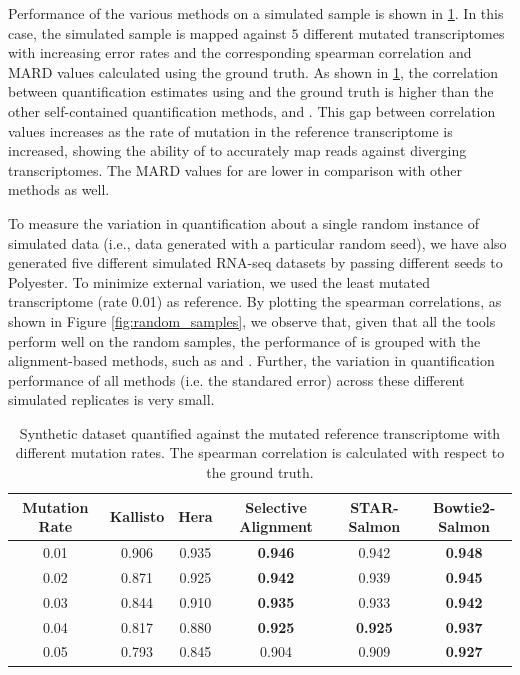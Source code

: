 Performance of the various methods on a simulated sample is shown in \cref{tab:diff_mutation}. In this case, 
the simulated sample is mapped against $5$ different mutated transcriptomes with increasing error rates and the 
corresponding spearman correlation and MARD values calculated using the ground truth. As shown in 
\cref{tab:diff_mutation}, the correlation between quantification estimates using \sla and the ground truth is 
higher than the other self-contained quantification methods, \kallisto and \hera. This gap between correlation 
values increases as the rate of mutation in the reference transcriptome is increased, showing the ability of 
\sla to accurately map reads against diverging transcriptomes. The MARD values for \sla are lower in comparison 
with other \nab methods as well.

To measure the variation in quantification about a single random instance of simulated data (i.e., data generated 
with a particular random seed), we have also generated five different simulated RNA-seq datasets by passing 
different seeds to Polyester. To minimize external variation, we used the least mutated transcriptome 
(rate 0.01) as reference. By plotting the spearman correlations, as shown in Figure \ref{fig:random_samples}, 
we observe that, given that all the tools perform well on the random samples, the performance of \sla is grouped 
with the alignment-based methods, such as \bt and \STAR.  Further, the variation in quantification performance of 
all methods (i.e. the standared error) across these different simulated replicates is very small.

\begin{table}
\begin{center}
\begin{tabular} {c|c c c c c}
\toprule
  Mutation Rate & Kallisto & Hera & Selective Alignment & STAR-Salmon &Bowtie2-Salmon \\
\midrule
  0.01 & 0.906 & 0.935 & \textbf{0.946} & 0.942 & \textbf{0.948} \\
  0.02 & 0.871 & 0.925 & \textbf{0.942} & 0.939 & \textbf{0.945} \\
  0.03 & 0.844 & 0.910 & \textbf{0.935} & 0.933 & \textbf{0.942} \\
  0.04 & 0.817 & 0.880 & \textbf{0.925} & \textbf{0.925} & \textbf{0.937} \\
  0.05 & 0.793 & 0.845 & 0.904 & 0.909 & \textbf{0.927} \\
\bottomrule
\end{tabular}
\caption[Acuracy of qunatification of synthetic dataset against the mutated reference transcriptome]{
  {Synthetic dataset quantified against the mutated reference transcriptome with different mutation rates. 
  The spearman correlation is calculated with respect to the ground truth.}
}
\vspace{-0.3in}
\label{tab:diff_mutation}
\end{center}
\end{table}

